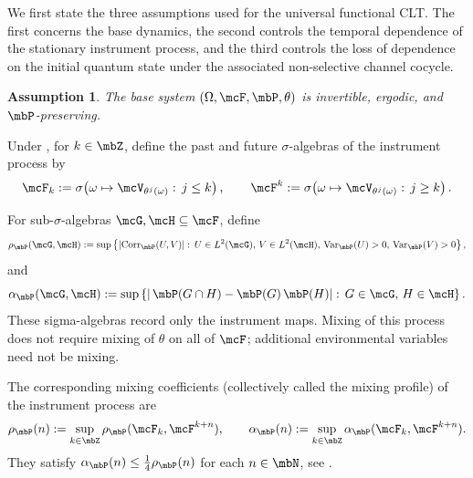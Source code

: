 \documentclass[a4paper]{article}
\numberwithin{equation}{section}   %
\theoremstyle{plain}   %
\theoremstyle{plain}   %
\newtheorem{assumption}{Assumption}     %
\theoremstyle{examplestyle}
\DeclareMathOperator{\pr}{\mbP}           %
\begin{document}

    We first state the three assumptions used for the universal functional CLT.
    The first concerns the base dynamics, the second controls the temporal dependence of the stationary instrument process, and the third controls the loss of dependence on the initial quantum state under the associated non-selective channel cocycle.

    \begin{assumption}
    \label{assumption1}
        The base system \((\Omega,\mcF,\pr,\theta)\) is invertible, ergodic, and \(\pr\)-preserving.
    \end{assumption}

    Under , for \(k\in\mbZ\), define the past and future \(\sigma\)-algebras of the instrument process by
    \begin{equation}
    \label{eq:past_and_future_sigma_instruments}
        \mcF_k
        :=
        \sigma\!\left(
            \omega\mapsto\mcV_{\theta^j(\omega)}:\,j\le k
        \right),
        \qquad
        \mcF^k
        :=
        \sigma\!\left(
            \omega\mapsto\mcV_{\theta^j(\omega)}:\,j\ge k
        \right).
    \end{equation}

    For sub-\(\sigma\)-algebras \(\mcG,\mcH\subseteq\mcF\), define
    \begin{equation}
    \label{eq:rho_mixing_cooef}
        \rho_{\pr}(\mcG,\mcH)
        :=
        \sup\left\{
            |\mathrm{Corr}_{\pr}(U,V)|:\,
            U\in L^2(\mcG),\,
            V\in L^2(\mcH),\,
            \mathrm{Var}_{\pr}(U)>0,\,
            \mathrm{Var}_{\pr}(V)>0
        \right\},
    \end{equation}
    and
    \begin{equation}
    \label{eq:alpha_mixing_cooef}
        \alpha_{\pr}(\mcG,\mcH)
        :=
        \sup\left\{
            |\pr(G\cap H)-\pr(G)\pr(H)|:\,
            G\in\mcG,\,
            H\in\mcH
        \right\}.
    \end{equation}
    These sigma-algebras record only the instrument maps. Mixing of this process does not require mixing of $\theta$ on all of $\mcF$; additional environmental variables need not be mixing.

    The corresponding mixing coefficients (collectively called the mixing profile) of the instrument process are
    \begin{equation}
    \label{eq:rho_n__and_alpha_n_disorder}
        \rho_{\pr}(n)
        :=
        \sup_{k\in\mbZ}
        \rho_{\pr}(\mcF_k,\mcF^{k+n}),
        \qquad
        \alpha_{\pr}(n)
        :=
        \sup_{k\in\mbZ}
        \alpha_{\pr}(\mcF_k,\mcF^{k+n}).
    \end{equation}
    They satisfy \(\alpha_{\pr}(n)\le\frac14\rho_{\pr}(n)\) for each $n\in\mbN$, see \cite{bradley2007introduction}.
\end{document}
